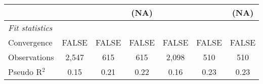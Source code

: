\begin{tabular}{lcccccc}
                                                                              &                        &                        & (NA)                   &                        &                        & (NA)\\   
   \midrule
   \emph{Fit statistics}\\
   Convergence                                                                &FALSE                   & FALSE                  & FALSE                  & FALSE                  & FALSE                  & FALSE\\  
   Observations                                                               & 2,547                  & 615                    & 615                    & 2,098                  & 510                    & 510\\  
   Pseudo R$^2$                                                               & 0.15                   & 0.21                   & 0.22                   & 0.16                   & 0.23                   & 0.23\\  
   

\end{tabular}
